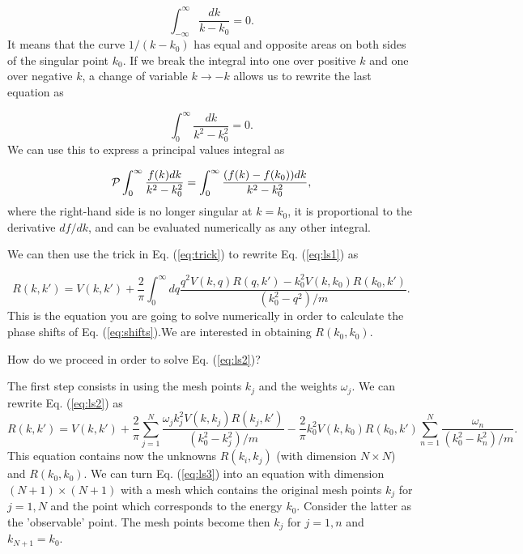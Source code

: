 \documentclass[%
oneside,                 %
final,                   %
10pt]{article}
\begin{document}
\begin{equation}
  \int_{-\infty}^{\infty} \frac{dk}{k-k_0} =0.
\end{equation}
It means that the curve $1/(k-k_0)$ has equal and opposite
areas on both sides of the singular point $k_0$. If we break
the integral into one over positive $k$ and one over 
negative $k$, a change of variable $k\rightarrow -k$ 
allows us to rewrite the last equation as

\begin{equation}
  \int_{0}^{\infty} \frac{dk}{k^2-k_0^2} =0.
\end{equation}
We can use this to express a principal values integral
as

\begin{equation}
  {\cal P}\int_{0}^{\infty} \frac{f(k)dk}{k^2-k_0^2} =
  \int_{0}^{\infty} \frac{(f(k)-f(k_0))dk}{k^2-k_0^2},
   \label{eq:trick}
\end{equation}
where the right-hand side is no longer singular at 
$k=k_0$, it is proportional to the derivative $df/dk$,
and can be evaluated numerically as any other integral.

We can then use the trick in Eq. (\ref{eq:trick}) to rewrite
Eq. (\ref{eq:ls1}) as

\begin{equation}
    R(k,k') = V(k,k') +\frac{2}{\pi}
                \int_0^{\infty}dq
                \frac{q^2V(k,q)R(q,k')-k_0^2V(k,k_0)R(k_0,k')  }
                     {(k_0^2-q^2)/m}.
   \label{eq:ls2}
\end{equation}
This is the equation you are going to solve numerically in order
to calculate the phase shifts of 
Eq. (\ref{eq:shifts}).We are interested in obtaining
$R(k_0,k_0)$.

How do we proceed in order to solve Eq. (\ref{eq:ls2})?

The first step consists in using the mesh points $k_j$ and the weights $\omega_j$. We can rewrite Eq. (\ref{eq:ls2}) as
\begin{equation} \label{eq:ls3}
R(k,k') = V(k,k') +\frac{2}{\pi}\sum_{j=1}^N\frac{\omega_jk_j^2V(k,k_j)R(k_j,k')}{(k_0^2-k_j^2)/m}-\frac{2}{\pi}k_0^2V(k,k_0)R(k_0,k')\sum_{n=1}^N\frac{\omega_n}{(k_0^2-k_n^2)/m}.                           
\end{equation}
This equation contains now the unknowns $R(k_i,k_j)$
(with dimension $N\times N$) and $R(k_0,k_0)$.
We can turn Eq. (\ref{eq:ls3}) into an equation with dimension $(N+1)\times (N+1)$ with  a mesh which contains the original mesh points $k_j$ for $j=1,N$ and the point which corresponds to the energy $k_0$. Consider the latter as the 'observable' point. The mesh points become then $k_j$ for $j=1,n$ and $k_{N+1}=k_0$.
\end{document}
